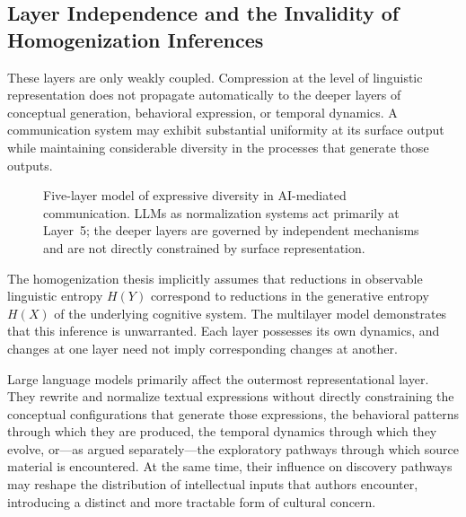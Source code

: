 \documentclass[12pt,a4paper]{article}
\theoremstyle{definition}
\theoremstyle{plain}
\theoremstyle{remark}
\begin{document}
\subsection{Layer Independence and the Invalidity of Homogenization Inferences}

These layers are only weakly coupled. Compression at the level of linguistic representation
does not propagate automatically to the deeper layers of conceptual generation, behavioral
expression, or temporal dynamics. A communication system may exhibit substantial uniformity
at its surface output while maintaining considerable diversity in the processes that generate
those outputs.

\begin{figure}[h]
\centering
{}
\caption{\small Five-layer model of expressive diversity in AI-mediated communication.
LLMs as normalization systems act primarily at Layer~5; the deeper layers are governed by
independent mechanisms and are not directly constrained by surface representation.}
\label{fig:multilayer}
\end{figure}

The homogenization thesis implicitly assumes that reductions in observable linguistic entropy
$H(Y)$ correspond to reductions in the generative entropy $H(X)$ of the underlying cognitive
system. The multilayer model demonstrates that this inference is unwarranted. Each layer
possesses its own dynamics, and changes at one layer need not imply corresponding changes at
another.

Large language models primarily affect the outermost representational layer. They rewrite and
normalize textual expressions without directly constraining the conceptual configurations that
generate those expressions, the behavioral patterns through which they are produced, the
temporal dynamics through which they evolve, or---as argued separately---the exploratory
pathways through which source material is encountered. At the same time, their influence on
discovery pathways may reshape the distribution of intellectual inputs that authors encounter,
introducing a distinct and more tractable form of cultural concern.
\end{document}
